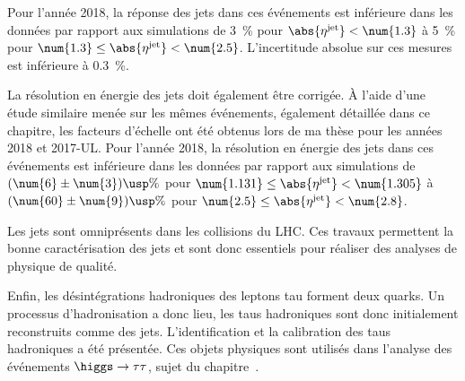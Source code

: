 Pour l'année 2018, la réponse des jets dans ces événements est inférieure dans les données par rapport aux simulations
de
\SI{3}{\%} pour $\abs{\eta^\text{jet}} < \num{1.3}$
à
\SI{5}{\%} pour $\num{1.3} \leq \abs{\eta^\text{jet}} < \num{2.5}$.
L'incertitude absolue sur ces mesures est inférieure à \SI{0.3}{\%}.
\par La résolution en énergie des jets doit également être corrigée.
À l'aide d'une étude similaire menée sur les mêmes événements, également détaillée dans ce chapitre, les facteurs d'échelle ont été obtenus lors de ma thèse pour les années 2018 et 2017-UL.
Pour l'année 2018, la résolution en énergie des jets dans ces événements est inférieure dans les données par rapport aux simulations
de
$(\num{6}\pm\num{3})\usp\%$ pour $\num{1.131} \leq \abs{\eta^\text{jet}} < \num{1.305}$
à
$(\num{60}\pm\num{9})\usp\%$ pour $\num{2.5} \leq \abs{\eta^\text{jet}} < \num{2.8}$.
\par Les jets sont omniprésents dans les collisions du LHC.
Ces travaux permettent la bonne caractérisation des jets et sont donc essentiels pour réaliser des analyses de physique de qualité.
\par
Enfin, les désintégrations hadroniques des leptons tau forment deux quarks.
Un processus d'hadronisation a donc lieu, les taus hadroniques sont donc initialement reconstruits comme des jets.
L'identification et la calibration des taus hadroniques a été présentée.
Ces objets physiques sont utilisés dans l'analyse des événements $\higgs\to\tau\tau$, sujet du chapitre~.